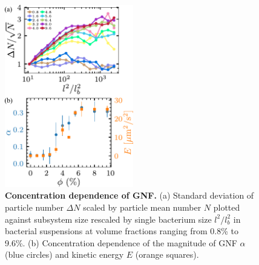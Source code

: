 \documentclass[twocolumn,aps,prl,amsmath,amssymb,longbibliography]{revtex4-2}
\begin{document}
\begin{figure}[ht]
\begin{center}
\includegraphics[width=0.5\textwidth]{figures/fig-3/v5.pdf}
\caption[Concentration dependence of GNF.]
{
\textbf{Concentration dependence of GNF.}
(a) Standard deviation of particle number $\Delta N$ scaled by particle mean number $N$ plotted against subsystem size rescaled by single bacterium size $l^2/l_b^2$ in bacterial suspensions at volume fractions ranging from 0.8\% to 9.6\%.
(b) Concentration dependence of the magnitude of GNF $\alpha$ (blue circles) and kinetic energy $E$ (orange squares).
}
\label{concentration-dependence}
\end{center}
\end{figure}
\end{document}
